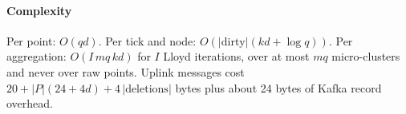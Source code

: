 \paragraph{Complexity} Per point: $O(qd)$. Per tick and node: $O(|\text{dirty}|(kd+\log q))$. Per aggregation: $O(I\,mq\,kd)$ for $I$ Lloyd iterations, over at most $mq$ micro-clusters and never over raw points. Uplink messages cost $20+|P|(24+4d)+4\,|\text{deletions}|$ bytes plus about 24 bytes of Kafka record overhead.
